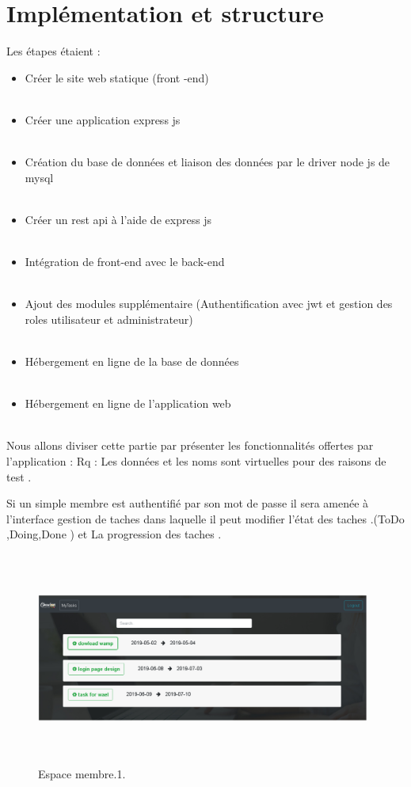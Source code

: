 \section{Impl\'{e}mentation et structure}

Les \'{e}tapes \'{e}taient :
\bigskip

\begin{itemize}
\item{ Cr\'{e}er le site web statique (front -end) }
\\~~
\item{Cr\'{e}er une application express js }
\\~~
\item{  Cr\'{e}ation du base de donn\'{e}es et liaison des donn\'{e}es par le driver node js
de mysql}
\\~~
\item{Cr\'{e}er un rest api \`{a} l'aide de express js }
\\~~
\item{Int\'{e}gration de front-end avec le back-end }
\\~~
\item{Ajout des modules suppl\'{e}mentaire (Authentification avec jwt et gestion
des roles utilisateur et administrateur) }
\\~~
\item{ H\'{e}bergement en ligne de la base de donn\'{e}es}
\\~~
\item{ H\'{e}bergement en ligne de l'application web}
\\~~
\end{itemize}



Nous allons diviser cette partie par pr\'{e}senter les fonctionnalit\'{e}s offertes par
l'application :
Rq : Les donn\'{e}es et les noms sont virtuelles pour des raisons de test .



Si un simple membre est authentifi\'{e} par son mot de passe il sera amen\'{e}e \`{a}
l'interface \guillemotleft{} gestion de taches \guillemotright{} dans laquelle il peut modifier l'\'{e}tat des
taches .(ToDo ,Doing,Done ) et La progression des taches .

\FloatBarrier
\begin{figure}[H]
\center
\includegraphics[width=11cm,height=7cm]{./figures/pres/2.png}
\caption{Espace membre.1.}

\end{figure}
\FloatBarrier

